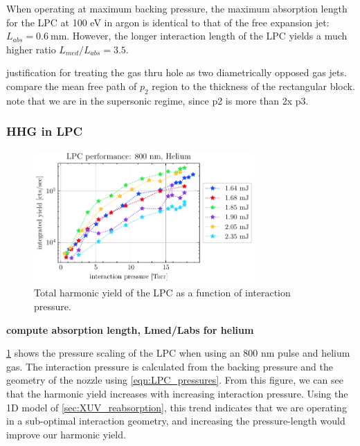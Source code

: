 When operating at maximum backing pressure, the maximum absorption length for the LPC at 100 eV in argon is identical to that of the free expansion jet: $L_{abs} = 0.6 \ \textrm{mm}$. However, the longer interaction length of the LPC yields a much higher ratio $L_{med}/L_{abs} = 3.5$.

justification for treating the gas thru hole as two diametrically opposed gas jets. compare the mean free path of $p_2$ region to the thickness of the rectangular block. note that we are in the supersonic regime, since p2 is more than 2x p3.

\subsubsection{HHG in LPC}

\begin{figure}
	\centering
	\includegraphics[width=0.75\textwidth]{figures/chap3/LPC_P_scaling_He800.pdf}
	\caption{Total harmonic yield of the LPC as a function of interaction pressure.}
	\label{fig:LPC_performance}
\end{figure}

\textbf{compute absorption length, Lmed/Labs for helium}





\cref{fig:LPC_performance} shows the pressure scaling of the LPC when using an 800 nm pulse and helium gas. The interaction pressure is calculated from the backing pressure and the geometry of the nozzle using \cref{eqn:LPC_pressures}. From this figure, we can see that the harmonic yield increases with increasing interaction pressure. Using the 1D model of \cref{sec:XUV_reabsorption}, this trend indicates that we are operating in a sub-optimal interaction geometry, and increasing the pressure-length would improve our harmonic yield.

